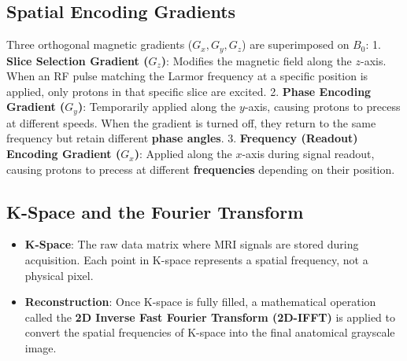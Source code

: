 \subsection*{Spatial Encoding Gradients}
Three orthogonal magnetic gradients ($G_x, G_y, G_z$) are superimposed on $B_0$:
1. \textbf{Slice Selection Gradient ($G_z$)}: Modifies the magnetic field along the $z$-axis. When an RF pulse matching the Larmor frequency at a specific position is applied, only protons in that specific slice are excited.
2. \textbf{Phase Encoding Gradient ($G_y$)}: Temporarily applied along the $y$-axis, causing protons to precess at different speeds. When the gradient is turned off, they return to the same frequency but retain different \textbf{phase angles}.
3. \textbf{Frequency (Readout) Encoding Gradient ($G_x$)}: Applied along the $x$-axis during signal readout, causing protons to precess at different \textbf{frequencies} depending on their position.

\subsection*{K-Space and the Fourier Transform}
\begin{itemize}
    \item \textbf{K-Space}: The raw data matrix where MRI signals are stored during acquisition. Each point in K-space represents a spatial frequency, not a physical pixel.
    \item \textbf{Reconstruction}: Once K-space is fully filled, a mathematical operation called the \textbf{2D Inverse Fast Fourier Transform (2D-IFFT)} is applied to convert the spatial frequencies of K-space into the final anatomical grayscale image.
\end{itemize}

\clearpage
